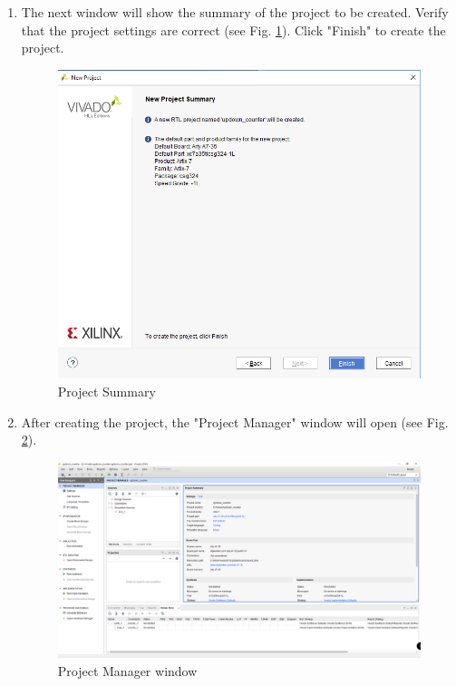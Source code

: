 \documentclass{article}
\begin{document}
\begin{enumerate}
    \item The next window will show the summary of the project to be created. Verify that the project settings are correct (see Fig. \ref{fig:5-project_summary}).
      Click "Finish" to create the project.
        \begin{figure}[h!]
          \centering
          \includegraphics[width=0.5\linewidth]{img/program/5-project_summary.png}
          \caption{Project Summary}
          \label{fig:5-project_summary}
        \end{figure}

    \item After creating the project, the "Project Manager" window will open (see Fig. \ref{fig:6-project_window}).
        \begin{figure}[h!]
          \centering
          \includegraphics[width=\linewidth]{img/program/6-project_window.png}
          \caption{Project Manager window}
          \label{fig:6-project_window}
        \end{figure}
  \end{enumerate}

\newpage
\clearpage
\end{document}
